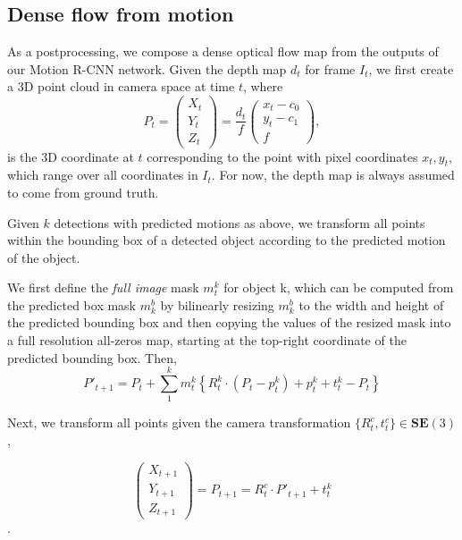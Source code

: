 \subsection{Dense flow from motion}
As a postprocessing, we compose a dense optical flow map from the outputs of our Motion R-CNN network.
Given the depth map $d_t$ for frame $I_t$, we first create a 3D point cloud in camera space at time $t$,
where
\begin{equation}
P_t =
\begin{pmatrix}
X_t \\ Y_t \\ Z_t
\end{pmatrix}
=
\frac{d_t}{f}
\begin{pmatrix}
x_t - c_0 \\ y_t - c_1 \\ f
\end{pmatrix},
\end{equation}
is the 3D coordinate at $t$ corresponding to the point with pixel coordinates $x_t, y_t$,
which range over all coordinates in $I_t$.
For now, the depth map is always assumed to come from ground truth.

Given $k$ detections with predicted motions as above, we transform all points within the bounding
box of a detected object according to the predicted motion of the object.

We first define the \emph{full image} mask $m_t^k$ for object k,
which can be computed from the predicted box mask $m_k^b$ by bilinearly resizing
$m_k^b$ to the width and height of the predicted bounding box and then copying the values
of the resized mask into a full resolution all-zeros map, starting at the top-right coordinate of the predicted bounding box.
Then,
\begin{equation}
P'_{t+1} =
P_t + \sum_1^{k} m_t^k\left\{ R_t^k \cdot (P_t - p_t^k) + p_t^k + t_t^k - P_t \right\}
\end{equation}

Next, we transform all points given the camera transformation $\{R_t^c, t_t^c\} \in \mathbf{SE}(3)$, %

\begin{equation}
\begin{pmatrix}
X_{t+1} \\ Y_{t+1} \\ Z_{t+1}
\end{pmatrix}
= P_{t+1} = R_t^c \cdot P'_{t+1} + t_t^k
\end{equation}.

